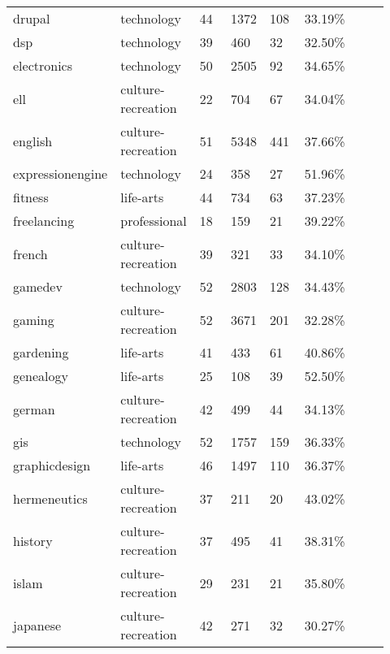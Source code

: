 \begin{longtabu}{@{}
	p{0.17\linewidth}
	p{0.2\linewidth}
	P{0.1\linewidth}
	P{0.1\linewidth}
	P{0.1\linewidth}
	P{0.1\linewidth}
	p{0.15\linewidth}@{}}
drupal           & technology         & 44    & 1372             & 108     & 33.19\%     \\
dsp              & technology         & 39    & 460              & 32      & 32.50\%     \\
electronics      & technology         & 50    & 2505             & 92      & 34.65\%     \\
ell              & culture-recreation & 22    & 704              & 67      & 34.04\%     \\
english          & culture-recreation & 51    & 5348             & 441     & 37.66\%     \\
expressionengine & technology         & 24    & 358              & 27      & 51.96\%     \\
fitness          & life-arts          & 44    & 734              & 63      & 37.23\%     \\
freelancing      & professional       & 18    & 159              & 21      & 39.22\%     \\
french           & culture-recreation & 39    & 321              & 33      & 34.10\%     \\
gamedev          & technology         & 52    & 2803             & 128     & 34.43\%     \\
gaming           & culture-recreation & 52    & 3671             & 201     & 32.28\%     \\
gardening        & life-arts          & 41    & 433              & 61      & 40.86\%     \\
genealogy        & life-arts          & 25    & 108              & 39      & 52.50\%     \\
german           & culture-recreation & 42    & 499              & 44      & 34.13\%     \\
gis              & technology         & 52    & 1757             & 159     & 36.33\%     \\
graphicdesign    & life-arts          & 46    & 1497             & 110     & 36.37\%     \\
hermeneutics     & culture-recreation & 37    & 211              & 20      & 43.02\%     \\
history          & culture-recreation & 37    & 495              & 41      & 38.31\%     \\
islam            & culture-recreation & 29    & 231              & 21      & 35.80\%     \\
japanese         & culture-recreation & 42    & 271              & 32      & 30.27\%     \\

\end{longtabu}
